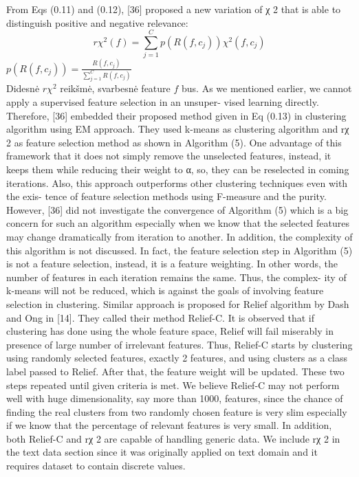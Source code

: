 \documentclass{VUMIFInfKursinis}
\begin{document}
From Eqs (0.11) and (0.12), [36] proposed a new variation of χ 2 that is able to distinguish positive and negative relevance: 
\begin{equation}
	r\chi^2(f)=\sum^{C}_{j=1}{p(R(f,c_j))\chi^2(f,c_j)}
\end{equation} 
$p(R(f,c_j))=\frac{R(f,c_j)}{\sum^{C}_{j=1}{R(f,c_j)}}$\\
Didesnė $r\chi^2$ reikšmė, svarbesnė feature $f$ bus.
As we mentioned earlier, we cannot apply a supervised feature selection in an unsuper- vised learning directly. Therefore, [36] embedded their proposed method given in Eq (0.13) in clustering algorithm using EM approach. They used k-means as clustering algorithm and rχ 2 as feature selection method as shown in Algorithm (5).
One advantage of this framework that it does not simply remove the unselected features, instead, it keeps them while reducing their weight to α, so, they can be reselected in coming iterations. Also, this approach outperforms other clustering techniques even with the exis- tence of feature selection methods using F-measure and the purity. However, [36] did not investigate the convergence of Algorithm (5) which is a big concern for such an algorithm especially when we know that the selected features may change dramatically from iteration to another. In addition, the complexity of this algorithm is not discussed. In fact, the feature selection step in Algorithm (5) is not a feature selection, instead, it is a feature weighting. In other words, the number of features in each iteration remains the same. Thus, the complex- ity of k-means will not be reduced, which is against the goals of involving feature selection in clustering.
Similar approach is proposed for Relief algorithm by Dash and Ong in [14]. They called their method Relief-C. It is observed that if clustering has done using the whole feature space, Relief will fail miserably in presence of large number of irrelevant features. Thus, Relief-C starts by clustering using randomly selected features, exactly 2 features, and using clusters as a class label passed to Relief. After that, the feature weight will be updated.  These two steps repeated until given criteria is met. We believe Relief-C may not perform well with huge dimensionality, say more than 1000, features, since the chance of finding the real clusters from two randomly chosen feature is very slim especially if we know that the percentage of relevant features is very small. In addition, both Relief-C and rχ 2 are capable of handling generic data. We include rχ 2 in the text data section since it was originally applied on text domain and it requires dataset to contain discrete values.
\end{document}
